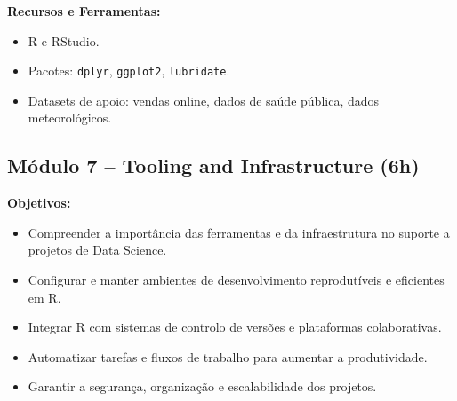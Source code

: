 \documentclass[12pt]{article}
\begin{document}
\textbf{Recursos e Ferramentas:}
\begin{itemize}
  \item R e RStudio.
  \item Pacotes: \texttt{dplyr}, \texttt{ggplot2}, \texttt{lubridate}.
  \item Datasets de apoio: vendas online, dados de saúde pública, dados meteorológicos.
\end{itemize}





\subsection*{Módulo 7 – Tooling and Infrastructure (6h)}

\textbf{Objetivos:}
\begin{itemize}
  \item Compreender a importância das ferramentas e da infraestrutura no suporte a projetos de Data Science.
  \item Configurar e manter ambientes de desenvolvimento reprodutíveis e eficientes em R.
  \item Integrar R com sistemas de controlo de versões e plataformas colaborativas.
  \item Automatizar tarefas e fluxos de trabalho para aumentar a produtividade.
  \item Garantir a segurança, organização e escalabilidade dos projetos.
\end{itemize}
\end{document}
